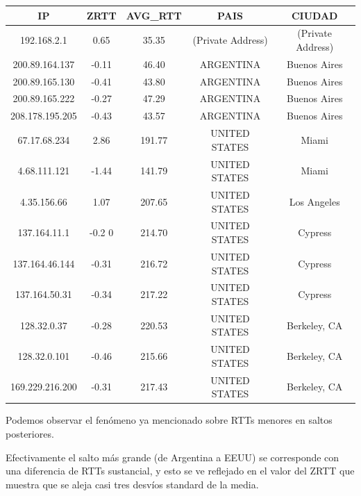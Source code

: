 \begin{tabular}{|c@{\hspace{5ex}}c@{\hspace{5ex}}c@{\hspace{5ex}}c@{\hspace{5ex}}c|}
 \hline
 \rule{0pt}{1.2em}IP & ZRTT & AVG\_RTT & PAIS & CIUDAD\\[0.2em]
 \hline

\rule{0pt}{1.2em} 192.168.2.1  &  0.65 & 35.35 & (Private Address) & (Private Address) \\[0.2em]
\rule{0pt}{1.2em} 200.89.164.137  &  -0.11 & 46.40 & ARGENTINA & Buenos Aires \\[0.2em]
\rule{0pt}{1.2em} 200.89.165.130  &  -0.41 & 43.80 & ARGENTINA & Buenos Aires \\[0.2em]
\rule{0pt}{1.2em} 200.89.165.222  &  -0.27 & 47.29 & ARGENTINA & Buenos Aires \\[0.2em]
\rule{0pt}{1.2em} 208.178.195.205  &  -0.43 & 43.57 & ARGENTINA & Buenos Aires \\[0.2em]
\rule{0pt}{1.2em} 67.17.68.234  &  2.86 & 191.77 & UNITED STATES & Miami \\[0.2em]
\rule{0pt}{1.2em} 4.68.111.121  &  -1.44 & 141.79 & UNITED STATES & Miami \\[0.2em]
\rule{0pt}{1.2em} 4.35.156.66  &  1.07 & 207.65 & UNITED STATES & Los Angeles \\[0.2em]
\rule{0pt}{1.2em} 137.164.11.1  &  -0.2 0& 214.70 & UNITED STATES & Cypress \\[0.2em]
\rule{0pt}{1.2em} 137.164.46.144  &  -0.31 & 216.72 & UNITED STATES & Cypress \\[0.2em]
\rule{0pt}{1.2em} 137.164.50.31  &  -0.34 & 217.22 & UNITED STATES & Cypress \\[0.2em]
\rule{0pt}{1.2em} 128.32.0.37  &  -0.28 & 220.53 & UNITED STATES & Berkeley, CA \\[0.2em]
\rule{0pt}{1.2em} 128.32.0.101  &  -0.46 & 215.66 & UNITED STATES & Berkeley, CA \\[0.2em]
\rule{0pt}{1.2em} 169.229.216.200  &  -0.31 & 217.43 & UNITED STATES & Berkeley, CA \\[0.2em]
\hline
 \end{tabular}

Podemos observar el fenómeno ya mencionado sobre RTTs menores en saltos posteriores.

Efectivamente el salto más grande (de Argentina a EEUU) se corresponde con una diferencia de RTTs sustancial, y esto se ve reflejado en el valor del ZRTT que muestra que se aleja casi tres desvíos standard de la media.

